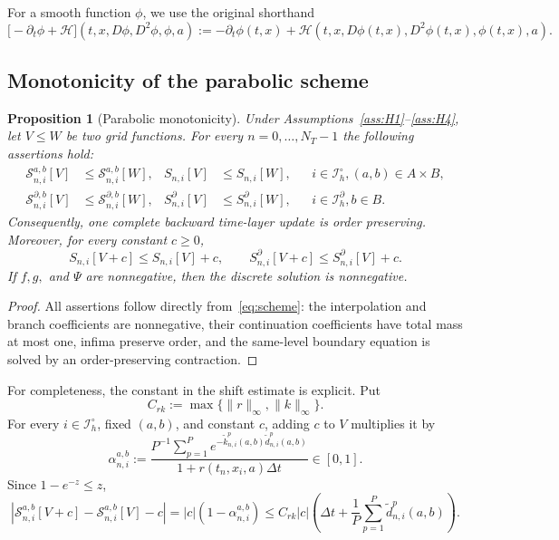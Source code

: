 \documentclass[11pt]{article}
\newtheorem{proposition}[theorem]{Proposition}
\theoremstyle{definition}
\theoremstyle{remark}
\newcommand{\cS}{\mathcal{S}}
\newcommand{\dt}{\Delta t}
\begin{document}
	For a smooth function $\phi$, we use the original shorthand
	\[
	\bigl[-\partial_t\phi+\mathcal H\bigr]
	(t,x,D\phi,D^2\phi,\phi,a)
	:=-\partial_t\phi(t,x)
	+\mathcal H(t,x,D\phi(t,x),D^2\phi(t,x),\phi(t,x),a).
	\]
	
	\subsection{Monotonicity of the parabolic scheme}
	
	\begin{proposition}[Parabolic monotonicity]\label{prop:monotone}
		Under Assumptions~\ref{ass:H1}--\ref{ass:H4}, let $V\le W$ be two grid
		functions.  For every $n=0,\ldots,N_T-1$ the following assertions hold:
		\begin{align}
			\cS_{n,i}^{a,b}[V]&\le\cS_{n,i}^{a,b}[W],
			&S_{n,i}[V]&\le S_{n,i}[W],
			&&i\in\mathcal I_h^\circ, (a,b)\in A\times B,
			\label{eq:para-monotone-interior}\\
			\cS_{n,i}^{\partial,b}[V]&\le\cS_{n,i}^{\partial,b}[W],
			&S_{n,i}^{\partial}[V]&\le S_{n,i}^{\partial}[W],
			&&i\in\mathcal I_h^\partial, b\in B.
			\label{eq:para-monotone-boundary}
		\end{align}
		Consequently, one complete backward time-layer update is order preserving.
		Moreover, for every constant $c\ge0$,
		\begin{equation}
			S_{n,i}[V+c]\le S_{n,i}[V]+c,\qquad
			S_{n,i}^{\partial}[V+c]\le S_{n,i}^{\partial}[V]+c.
			\label{eq:para-shift}
		\end{equation}
		If $f,g,$ and $\Psi$ are nonnegative, then the discrete solution is
		nonnegative.
	\end{proposition}
	
	\begin{proof}
		All assertions follow directly from~\eqref{eq:scheme}: the interpolation and branch coefficients are nonnegative, their continuation coefficients have total mass at most one, infima preserve order, and the same-level boundary equation is solved by an order-preserving contraction.
	\end{proof}
	
	For completeness, the constant in the shift estimate is explicit.  Put
	\[
	C_{rk}:=\max\{\|r\|_\infty,\|k\|_\infty\}.
	\]
	For every
	$i\in\mathcal I_h^\circ$, fixed $(a,b)$, and constant $c$, adding $c$ to
	$V$ multiplies it by
	\[
	\alpha_{n,i}^{a,b}:=
	\frac{P^{-1}\sum_{p=1}^P
		e^{-\widetilde k_{n,i}^p(a,b)\widetilde d_{n,i}^p(a,b)}}
	{1+r(t_n,x_i,a)\dt}\in[0,1].
	\]
	Since $1-e^{-z}\le z$,
	\begin{equation}
		\left|\cS_{n,i}^{a,b}[V+c]-\cS_{n,i}^{a,b}[V]-c\right|
		=|c|(1-\alpha_{n,i}^{a,b})
		\le C_{rk}|c|\left(\dt+\frac1P\sum_{p=1}^P
		\widetilde d_{n,i}^p(a,b)\right).
		\label{eq:shift-defect}
	\end{equation}
	
\end{document}
